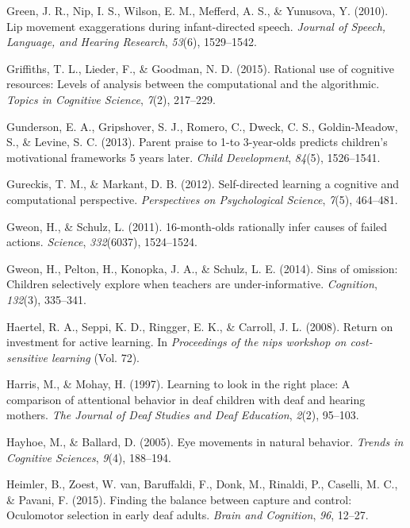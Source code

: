 \documentclass[oneside]{report}
\begin{document}
\hypertarget{ref-green2010lip}{}
Green, J. R., Nip, I. S., Wilson, E. M., Mefferd, A. S., \& Yunusova, Y.
(2010). Lip movement exaggerations during infant-directed speech.
\emph{Journal of Speech, Language, and Hearing Research}, \emph{53}(6),
1529--1542.

\hypertarget{ref-griffiths2015rational}{}
Griffiths, T. L., Lieder, F., \& Goodman, N. D. (2015). Rational use of
cognitive resources: Levels of analysis between the computational and
the algorithmic. \emph{Topics in Cognitive Science}, \emph{7}(2),
217--229.

\hypertarget{ref-gunderson2013parent}{}
Gunderson, E. A., Gripshover, S. J., Romero, C., Dweck, C. S.,
Goldin-Meadow, S., \& Levine, S. C. (2013). Parent praise to 1-to
3-year-olds predicts children's motivational frameworks 5 years later.
\emph{Child Development}, \emph{84}(5), 1526--1541.

\hypertarget{ref-gureckis2012self}{}
Gureckis, T. M., \& Markant, D. B. (2012). Self-directed learning a
cognitive and computational perspective. \emph{Perspectives on
Psychological Science}, \emph{7}(5), 464--481.

\hypertarget{ref-gweon201116}{}
Gweon, H., \& Schulz, L. (2011). 16-month-olds rationally infer causes
of failed actions. \emph{Science}, \emph{332}(6037), 1524--1524.

\hypertarget{ref-gweon2014sins}{}
Gweon, H., Pelton, H., Konopka, J. A., \& Schulz, L. E. (2014). Sins of
omission: Children selectively explore when teachers are
under-informative. \emph{Cognition}, \emph{132}(3), 335--341.

\hypertarget{ref-haertel2008return}{}
Haertel, R. A., Seppi, K. D., Ringger, E. K., \& Carroll, J. L. (2008).
Return on investment for active learning. In \emph{Proceedings of the
nips workshop on cost-sensitive learning} (Vol. 72).

\hypertarget{ref-harris1997learning}{}
Harris, M., \& Mohay, H. (1997). Learning to look in the right place: A
comparison of attentional behavior in deaf children with deaf and
hearing mothers. \emph{The Journal of Deaf Studies and Deaf Education},
\emph{2}(2), 95--103.

\hypertarget{ref-hayhoe2005eye}{}
Hayhoe, M., \& Ballard, D. (2005). Eye movements in natural behavior.
\emph{Trends in Cognitive Sciences}, \emph{9}(4), 188--194.

\hypertarget{ref-heimler2015finding}{}
Heimler, B., Zoest, W. van, Baruffaldi, F., Donk, M., Rinaldi, P.,
Caselli, M. C., \& Pavani, F. (2015). Finding the balance between
capture and control: Oculomotor selection in early deaf adults.
\emph{Brain and Cognition}, \emph{96}, 12--27.
\end{document}
